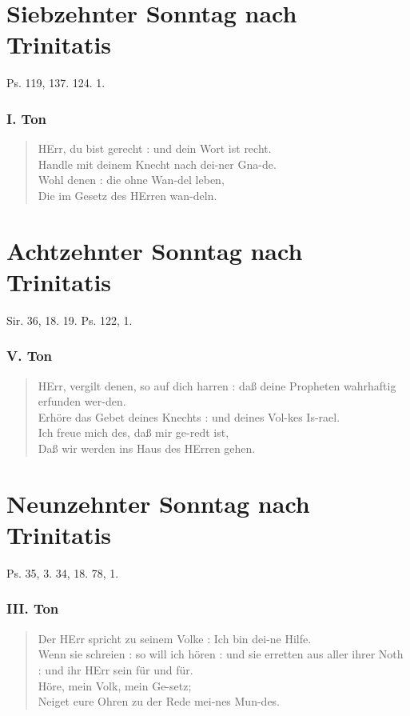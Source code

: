 \section{Siebzehnter Sonntag nach Trinitatis}

Ps. 119, 137. 124. 1.

\subsubsection{I. Ton}
\begin{verse}
HErr, du bist gerecht : und dein Wort ist recht.\\
Handle mit deinem Knecht nach dei-ner Gna-de.\\
Wohl denen : die ohne Wan-del leben,\\
Die im Gesetz des HErren wan-deln.
\end{verse}

\section{Achtzehnter Sonntag nach Trinitatis}

Sir. 36, 18. 19. Ps. 122, 1.

\subsubsection{V. Ton}
\begin{verse}
HErr, vergilt denen, so auf dich harren : daß deine Propheten wahrhaftig erfunden wer-den.\\
Erhöre das Gebet deines Knechts : und deines Vol-kes Is-rael.\\
Ich freue mich des, daß mir ge-redt ist,\\
Daß wir werden ins Haus des HErren gehen.
\end{verse}

\section{Neunzehnter Sonntag nach Trinitatis}

Ps. 35, 3. 34, 18. 78, 1.

\subsubsection{III. Ton}
\begin{verse}
Der HErr spricht zu seinem Volke : Ich bin dei-ne Hilfe.\\
Wenn sie schreien : so will ich hören : und sie erretten aus aller ihrer Noth : und ihr HErr sein für und für.\\
Höre, mein Volk, mein Ge-setz;\\
Neiget eure Ohren zu der Rede mei-nes Mun-des.
\end{verse}

